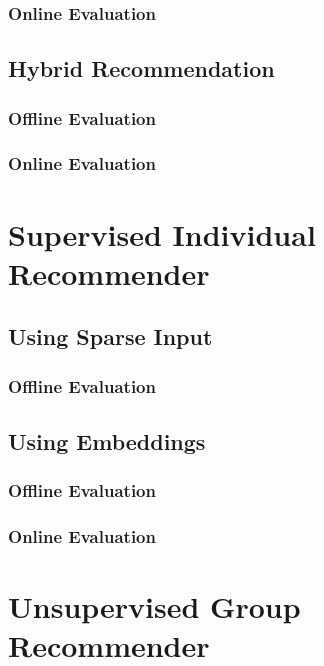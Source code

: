 \subsubsection{Online Evaluation}

\subsection{Hybrid Recommendation}

\subsubsection{Offline Evaluation}

\subsubsection{Online Evaluation}


\section{Supervised Individual Recommender}

\subsection{Using Sparse Input}

\subsubsection{Offline Evaluation}


\subsection{Using Embeddings}

\subsubsection{Offline Evaluation}

\subsubsection{Online Evaluation}

\section{Unsupervised Group Recommender}

